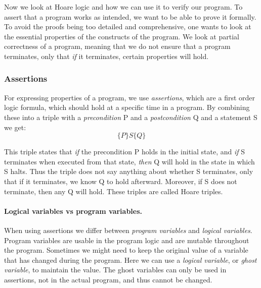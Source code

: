 Now we look at Hoare logic and how we can use it to verify our program.
To assert that a program works as intended, we want to be able to prove it formally. To avoid the proofs being too detailed and comprehensive, one wants to look at the essential properties of the constructs of the program. We look at partial correctness of a program, meaning that we do not ensure that a program terminates, only that \textit{if} it terminates, certain properties will hold.

\subsubsection{Assertions}
For expressing properties of a program, we use \textit{assertions}, which are a first order logic formula, which should hold at a specific time in a program.
By combining these into a triple with a \textit{precondition} P and a \textit{postcondition} Q and a statement S we get:
$$ \{ P \} S \{ Q \} $$

This triple states that \textit{if} the precondition P holds in the initial state, and \textit{if} S terminates when executed from that state, \textit{then} Q will hold in the state in which S halts.
Thus the triple does not say anything about whether S terminates, only that if it terminates, we know Q to hold afterward. Moreover, if S does not terminate, then any Q will hold. These triples are called Hoare triples.


\paragraph{Logical variables vs program variables.}
When using assertions we differ between \textit{program variables} and \textit{logical variables}.
Program variables are usable in the program logic and are mutable throughout the program.
Sometimes we might need to keep the original value of a variable that has changed during the program. Here we can use a \textit{logical variable}, or \textit{ghost variable}, to maintain the value. The ghost variables can only be used in assertions, not in the actual program, and thus cannot be changed.

